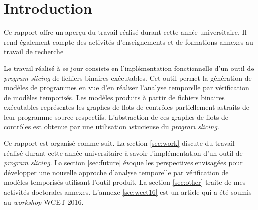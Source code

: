 \section*{Introduction}


  Ce rapport offre un aperçu du travail réalisé durant cette année
  universitaire. Il rend également compte des activités d'enseignements et de
  formations annexes au travail de recherche.

  Le travail réalisé à ce jour consiste en l'implémentation fonctionnelle d'un
  outil de \textit{program slicing} de fichiers binaires exécutables. Cet outil
  permet la génération de modèles de programmes en vue d'en réaliser l'analyse
  temporelle par vérification de modèles temporisés. Les modèles produits à
  partir de fichiers binaires exécutables représentes les graphes de flots de
  contrôles partiellement astraits de leur programme source respectifs.
  L'abstraction de ces graphes de flots de contrôles est obtenue par une
  utilisation astucieuse du \textit{program slicing}.

  Ce rapport est organisé comme suit. La section \ref{sec:work} discute du
  travail réalisé durant cette année universitaire à savoir l'implémentation
  d'un outil de \emph{program slicing}. La section \ref{sec:future} évoque les
  perspectives envisagées pour développer une nouvelle approche d'analyse
  temporelle par vérification de modèles temporisés utilisant l'outil produit.
  La section \ref{sec:other} traite de mes activités doctorales annexes.
  L'annexe \ref{sec:wcet16} est un article qui a été soumis au \emph{workshop}
  WCET 2016.
